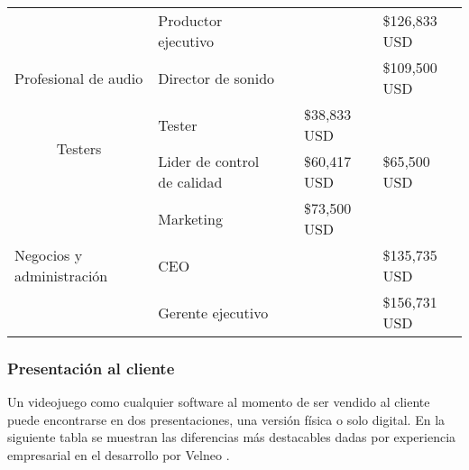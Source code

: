 \begin{table}[htbp]
\begin{tabular}{lllll}
		\multicolumn{1}{c}{}                                      & Productor ejecutivo         &                                     &                             & \$126,833 USD                          \\
		Profesional de audio                                      & Director de sonido          &                                     &                             & \$109,500 USD                          \\
		\multicolumn{1}{c}{\multirow{2}{*}{Testers}}              & Tester                      &                                     & \$38,833 USD                &                                        \\
		\multicolumn{1}{c}{}                                      & Lider de control de calidad &                                     & \$60,417 USD                & \$65,500 USD                           \\
		\multirow{3}{*}{Negocios y administración}                & Marketing                   &                                     & \$73,500 USD                &                                        \\
		& CEO                         &                                     &                             & \$135,735 USD                          \\
		& Gerente ejecutivo           &                                     &                             & \$156,731 USD                         
	\end{tabular}
\end{table}

\subsubsection{Presentación al cliente}
Un videojuego como cualquier software al momento de ser vendido al cliente puede encontrarse en dos presentaciones, una versión física o solo digital. En la siguiente tabla \cite{fiDi} se muestran las diferencias más destacables dadas por experiencia empresarial en el desarrollo por Velneo \cite{velneo2015}.

